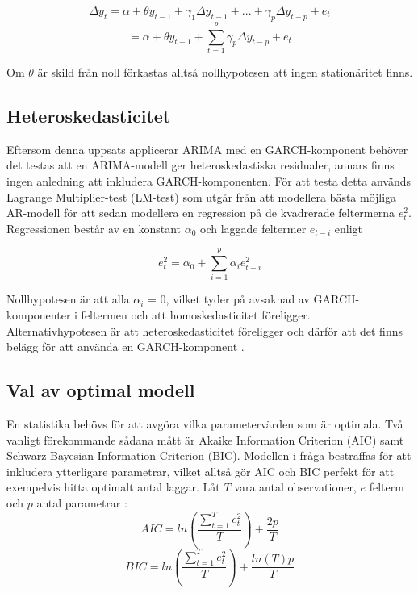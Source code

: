 \documentclass[11pt]{article}
\numberwithin{equation}{section}
\numberwithin{table}{section}
\numberwithin{figure}{section}
\begin{document}
\begin{equation}
    \Delta y_t = \alpha + \theta y_{t-1} + \gamma_1\Delta y_{t-1} + ... + \gamma_p\Delta y_{t-p} + e_t
\end{equation}
\begin{equation}
        = \alpha + \theta y_{t-1} + \sum_{t=1}^{p}\gamma_p \Delta y_{t-p} + e_t
\end{equation}

Om \(\theta\) är skild från noll förkastas alltså nollhypotesen att ingen stationäritet finns.

\subsection{Heteroskedasticitet}

Eftersom denna uppsats applicerar ARIMA med en GARCH-komponent behöver det testas att en ARIMA-modell ger heteroskedastiska residualer, annars finns ingen anledning att inkludera GARCH-komponenten. För att testa detta används Lagrange Multiplier-test (LM-test) som utgår från att modellera bästa möjliga AR-modell för att sedan modellera en regression på de kvadrerade feltermerna \(e_t^2\). Regressionen består av en konstant \(\alpha_0\) och laggade feltermer \(e_{t-i}\) enligt

\begin{equation}
    e_t^2=\alpha_0+\sum_{i=1}^{p}\alpha_ie_{t-i}^2
\end{equation}

Nollhypotesen är att alla \(\alpha_i\) = 0, vilket tyder på avsaknad av GARCH-komponenter i feltermen och att homoskedasticitet föreligger. Alternativhypotesen är att heteroskedasticitet föreligger och därför att det finns belägg för att använda en GARCH-komponent \parencite{engle1982autoregressive}. 

\subsection{Val av optimal modell}
En statistika behövs för att avgöra vilka parametervärden som är optimala. Två vanligt förekommande sådana mått är Akaike Information Criterion (AIC) samt Schwarz Bayesian Information Criterion (BIC). Modellen i fråga bestraffas för att inkludera ytterligare parametrar, vilket alltså gör AIC och BIC perfekt för att exempelvis hitta optimalt antal laggar. Låt $T$ vara antal observationer, $e$ felterm och $p$ antal parametrar \parencite[][s.76 f.]{montgomery2015forecasting}:
\begin{equation}
    AIC = ln\left( \frac{\sum_{t=1}^{T}e^2_t}{T} \right)+\frac{2p}{T}
\end{equation}
\begin{equation}
    BIC = ln\left( \frac{\sum_{t=1}^{T}e^2_t}{T} \right)+\frac{ln(T)p}{T}
\end{equation}
\end{document}
